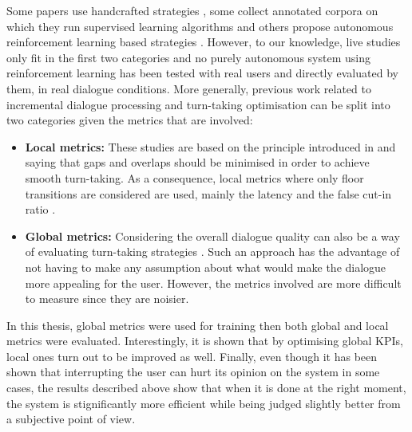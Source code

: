        Some papers use handcrafted strategies \cite{Raux2009,Ghigi2014}, some collect annotated corpora on which they run supervised learning algorithms \cite{Meena2013} and others propose autonomous reinforcement learning based strategies \cite{Jonsdottir2008,Selfridge2010,Dethlefs2012}. However, to our knowledge, live studies only fit in the first two categories and no purely autonomous system using reinforcement learning has been tested with real users and directly evaluated by them, in real dialogue conditions. More generally, previous work related to incremental dialogue processing and turn-taking optimisation can be split into two categories given the metrics that are involved:

        \begin{itemize}
          \item \textbf{Local metrics:} These studies are based on the principle introduced in \cite{Sacks1974} and saying that gaps and overlaps should be minimised in order to achieve smooth turn-taking. As a consequence, local metrics where only floor transitions are considered are used, mainly the latency and the false cut-in ratio \cite{Jonsdottir2008,Raux2012}.
          \item \textbf{Global metrics:} Considering the overall dialogue quality can also be a way of evaluating turn-taking strategies \cite{Selfridge2010,Ghigi2014}. Such an approach has the advantage of not having to make any assumption about what would make the dialogue more appealing for the user. However, the metrics involved are more difficult to measure since they are noisier.
        \end{itemize}

        In this thesis, global metrics were used for training then both global and local metrics were evaluated. Interestingly, it is shown that by optimising global KPIs, local ones turn out to be improved as well. Finally, even though it has been shown that interrupting the user can hurt its opinion on the system in some cases\cite{Hirasawa1999}, the results described above show that when it is done at the right moment, the system is stignificantly more efficient while being judged slightly better from a subjective point of view.

